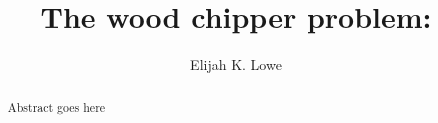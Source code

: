 \documentclass{msuphddissertation}
\author{Elijah K. Lowe} %
\title{The wood chipper problem: } %
\begin{document}
\maketitlepage %
\begin{abstract}
Abstract goes here
\end{abstract}



\begin{dedication}
\begin{center} 

\end{center}
\end{dedication}

\begin{acknowledgment}

\end{acknowledgment}


\TOC

\LOT

\LOF

\end{document}
